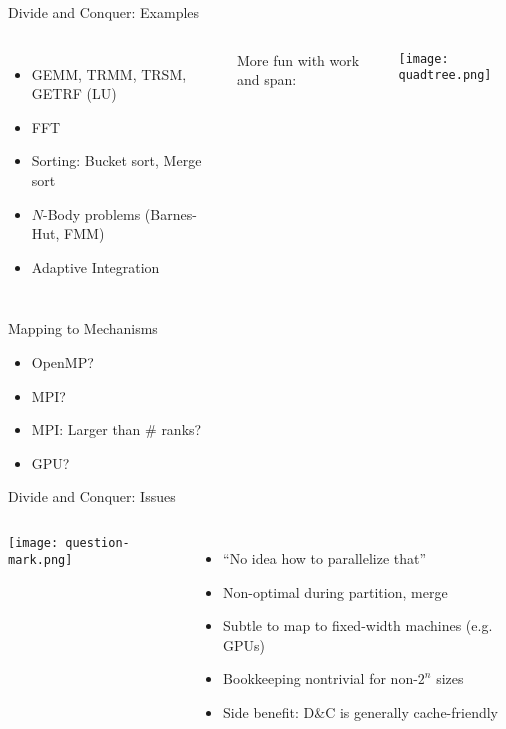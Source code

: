 \documentclass[english,compress]{beamer}
\begin{document}
\begin{frame}{Divide and Conquer: Examples}
  \begin{columns}
      \begin{itemize}
        \item GEMM, TRMM, TRSM, GETRF (LU)
        \item FFT
        \item Sorting: Bucket sort, Merge sort
        \item $N$-Body problems (Barnes-Hut, FMM)
        \item Adaptive Integration
      \end{itemize}

      More fun with work and span:

      \texttt{[image: quadtree.png]}
  \end{columns}
\end{frame}

\begin{frame}{Mapping to Mechanisms}
  \begin{itemize}[<+->]
    \item OpenMP?
    \item MPI?
    \item MPI: Larger than \# ranks?
    \item GPU?
  \end{itemize}
\end{frame}
\begin{frame}{Divide and Conquer: Issues}
  \begin{columns}
      \texttt{[image: question-mark.png]}
      \begin{itemize}
        \item ``No idea how to parallelize that''
        \item Non-optimal during partition, merge
        \item Subtle to map to fixed-width machines (e.g. GPUs)
        \item Bookkeeping nontrivial for non-$2^n$ sizes
        \item Side benefit: D\&C is generally cache-friendly
      \end{itemize}
  \end{columns}
\end{frame}
\end{document}
